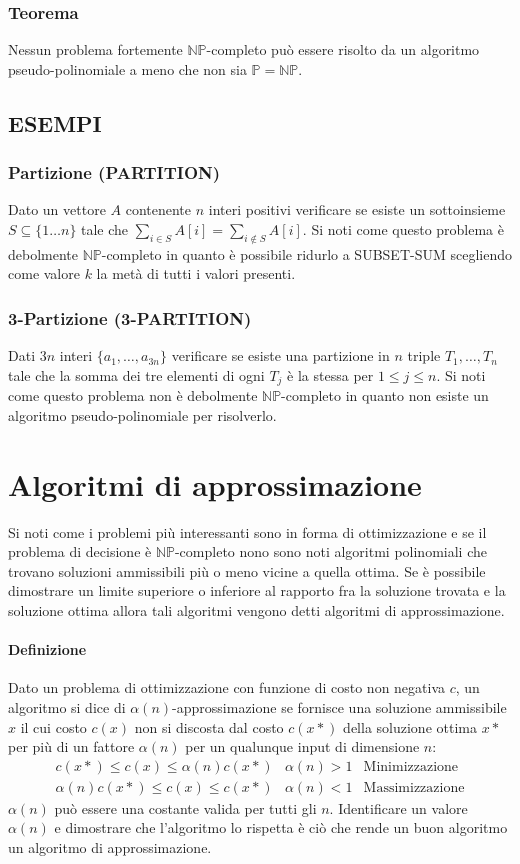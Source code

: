 \subsubsection{Teorema}
Nessun problema fortemente $\mathbb{NP}$-completo pu\`o essere risolto da un algoritmo pseudo-polinomiale a meno che non sia $\mathbb{P}=\mathbb{NP}$.
\subsection{ESEMPI}
\subsubsection{Partizione (PARTITION)}
Dato un vettore $A$ contenente $n$ interi positivi verificare se esiste un sottoinsieme $S\subseteq\{1\dots n\}$ tale che $\sum\limits_{i\in S}A[i] = \sum\limits_{i\not\in S}A[i]$. Si
noti come questo problema \`e debolmente $\mathbb{NP}$-completo in quanto \`e possibile ridurlo a SUBSET-SUM scegliendo come valore $k$ la met\`a di tutti i valori presenti.
\subsubsection{3-Partizione (3-PARTITION)}
Dati $3n$ interi $\{a_1, \dots, a_{3n}\}$ verificare se esiste una partizione in $n$ triple $T_1, \dots, T_n$ tale che la somma dei tre elementi di ogni $T_j$ \`e la stessa per $1\le j
\le n$. Si noti come questo problema non \`e debolmente $\mathbb{NP}$-completo in quanto non esiste un algoritmo pseudo-polinomiale per risolverlo.
\section{Algoritmi di approssimazione}
Si noti come i problemi pi\`u interessanti sono in forma di ottimizzazione e se il problema di decisione \`e $\mathbb{NP}$-completo nono sono noti algoritmi polinomiali che trovano
soluzioni ammissibili pi\`u o meno vicine a quella ottima. Se \`e possibile dimostrare un limite superiore o inferiore al rapporto fra la soluzione trovata e la soluzione ottima allora
tali algoritmi vengono detti algoritmi di approssimazione. 
\paragraph{Definizione}
Dato un problema di ottimizzazione con funzione di costo non negativa $c$, un algoritmo si dice di $\alpha(n)$-approssimazione se fornisce una soluzione ammissibile $x$ il cui costo
$c(x)$ non si discosta dal costo $c(x*)$ della soluzione ottima $x*$ per pi\`u di un fattore $\alpha(n)$ per un qualunque input di dimensione $n$: 
\begin{align*}
	c(x*)\le c(x)\le\alpha(n)c(x*) & \alpha(n)>1 & \text{Minimizzazione}\\
	\alpha(n)c(x*)\le c(x)\le c(x*) & \alpha(n)<1 & \text{Massimizzazione}
\end{align*}
$\alpha(n)$ pu\`o essere una costante valida per tutti gli $n$. Identificare un valore $\alpha(n)$ e dimostrare che l'algoritmo lo rispetta \`e ci\`o che rende un buon algoritmo un
algoritmo di approssimazione.
